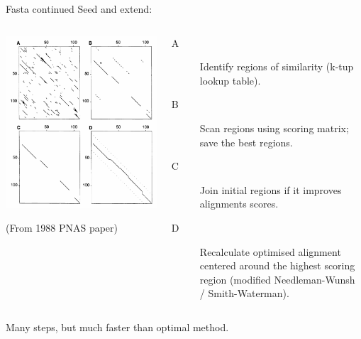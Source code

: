 \documentclass[pdf]{beamer}
\begin{document}
\begin{frame}{Fasta continued}
  Seed and extend:
  \begin{columns}
    \begin{column}{0.5\textwidth}
      \includegraphics[width=\textwidth]{images/Fasta_four_steps_b}

      {\tiny (From 1988 PNAS paper)}
    \end{column}
    \begin{column}{0.6\textwidth}
      {\footnotesize
      \begin{description}
      \item[A] Identify regions of similarity (k-tup lookup table).
      \item[B] Scan regions using scoring matrix; save the best regions.
      \item[C] Join initial regions if it improves alignments scores.
      \item[D] Recalculate optimised alignment centered around the highest
        scoring region (modified Needleman-Wunsh / Smith-Waterman).
      \end{description}
      }
    \end{column}
  \end{columns}
  {\tiny Many steps, but much faster than optimal method.}
\end{frame}
\end{document}
